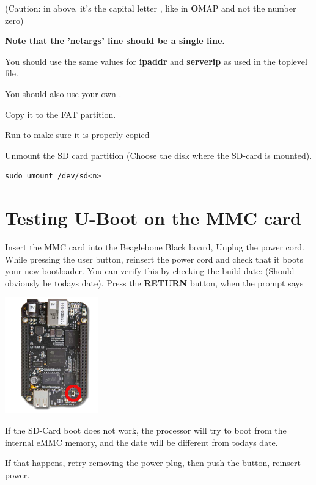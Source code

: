(Caution: in  above, it's the capital letter , like in
{\bf O}MAP and not the number zero)

{\bf Note that the 'netargs' line should be a single line.}

You should use the same values for {\bf ipaddr} and {\bf serverip} as used in the toplevel  file.

You should also use your own {\bf {}}.

Copy  it to the FAT partition.

Run  to make sure it is properly copied

Unmount the SD card partition (Choose the disk where the SD-card is mounted).

\begin{verbatim}
sudo umount /dev/sd<n>
\end{verbatim}

\clearpage

\section{Testing U-Boot on the MMC card}

Insert the MMC card into the Beaglebone Black board, Unplug the power cord.
While pressing the user button, reinsert the power cord and check that it boots your new bootloader. 
You can verify this by checking the build date: (Should obviously be todays date). 
Press the {\bf RETURN} button, when the prompt says 

\begin{center}
    \includegraphics[height=5cm]{labs/sysdev-u-boot-BBB/beagleboneblack-user-button.png}
\end{center}

If the SD-Card boot does not work, the processor will try to boot from the internal eMMC memory,
and the date will be different from todays date.

If that happens, retry removing the power plug, then push the button, reinsert power.

